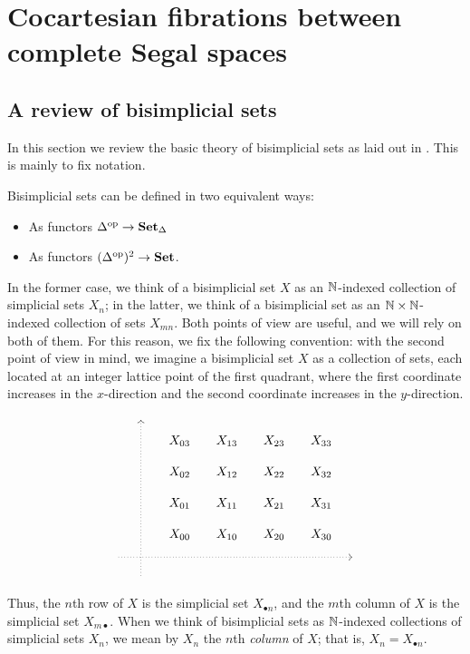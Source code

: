 \documentclass[main.tex]{subfiles}
\begin{document}
\section{Cocartesian fibrations between complete Segal spaces}
\label{sec:cocartesian_fibrations_between_complete_segal_spaces}

\subsection{A review of bisimplicial sets}
\label{ssc:a_review_of_bisimplicial_sets}

In this section we review the basic theory of bisimplicial sets as laid out in \cite{qcats_vs_segal_spaces}. This is mainly to fix notation.

Bisimplicial sets can be defined in two equivalent ways:
\begin{itemize}
  \item As functors $\Delta^{\mathrm{op}} \to \mathbf{Set}_{\Delta}$

  \item As functors $(\Delta^{\mathrm{op}})^{2} \to \mathbf{Set}$.
\end{itemize}
In the former case, we think of a bisimplicial set $X$ as an $\mathbb{N}$-indexed collection of simplicial sets $X_{n}$; in the latter, we think of a bisimplicial set as an $\mathbb{N} \times \mathbb{N}$-indexed collection of sets $X_{mn}$. Both points of view are useful, and we will rely on both of them. For this reason, we fix the following convention: with the second point of view in mind, we imagine a bisimplicial set $X$ as a collection of sets, each located at an integer lattice point of the first quadrant, where the first coordinate increases in the $x$-direction and the second coordinate increases in the $y$-direction. 
\begin{equation*}
  \begin{tikzcd}[row sep=small, column sep=small]
    & \
    \arrow[dddddd, leftarrow, dotted, at start]
    \\
    && X_{03}
    & X_{13}
    & X_{23}
    & X_{33}
    \\
    && X_{02}
    & X_{12}
    & X_{22}
    & X_{32}
    \\
    && X_{01}
    & X_{11}
    & X_{21}
    & X_{31}
    \\
    && X_{00}
    & X_{10}
    & X_{20}
    & X_{30}
    \\
    \
    \arrow[rrrrrr, dotted, at end]
    &&&&&& \
    \\
    & \
  \end{tikzcd}
\end{equation*}
Thus, the $n$th row of $X$ is the simplicial set $X_{\bullet n}$, and the $m$th column of $X$ is the simplicial set $X_{m \bullet}$. When we think of bisimplicial sets as $\mathbb{N}$-indexed collections of simplicial sets $X_{n}$, we mean by $X_{n}$ the $n$th \emph{column} of $X$; that is, $X_{n} = X_{\bullet n}$.
\end{document}
